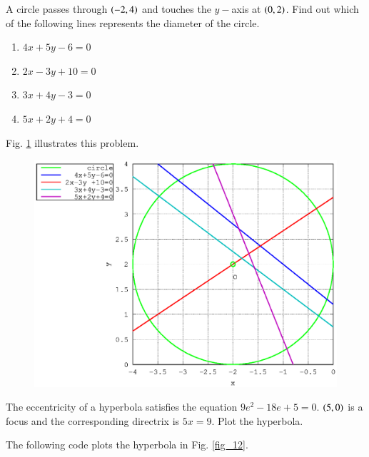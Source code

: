 \documentclass[journal,12pt,twocolumn]{IEEEtran}
\begin{document}
\begin{problem}
A circle passes through $\left(-2,4\right)$ and touches the $y-$axis at $\left(0,2\right)$. Find out which of the following lines represents the diameter of the circle.
\begin{enumerate}
\item $4x+5y-6=0$
\item $2x-3y +10 = 0$
\item $3x+4y-3 = 0$
\item $5x+2y+4 = 0$
\end{enumerate}
\end{problem}
%
\solution

Fig. \ref{fig_11} illustrates this problem.

\begin{figure}
\begin{center}
\includegraphics[width=\columnwidth]{./figs/ee16b1011}
\end{center}
\label{fig_11}	
\end{figure}
%
\begin{problem}
The eccentricity of a hyperbola satisfies the equation $9e^2-18e+5 = 0$. $\left(5,0\right)$ is a focus and the corresponding directrix is $5x = 9$. Plot the hyperbola.
\end{problem}
%
\solution

%
The following code plots the hyperbola in Fig. \ref{fig_12}.

\end{document}
